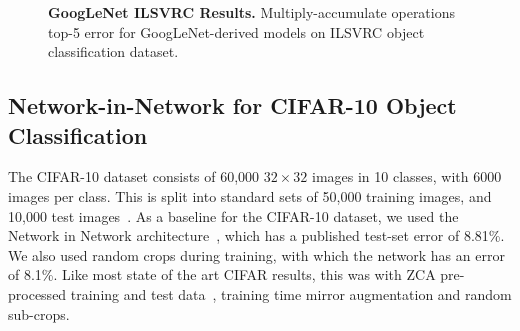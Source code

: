 \documentclass[thesis]{subfiles}
\begin{document}
    \begin{figure}[tbp] 
        \centering
        \datatable
        
        
        \caption[Low-Rank GoogLeNet ILSVRC results]{\textbf{GoogLeNet ILSVRC Results.} Multiply-accumulate operations \vs top-5 error for GoogLeNet-derived models on ILSVRC object classification dataset.}
        \label{fig:googlenetimagenetresultsch4}
    \end{figure}
    
    \subsection{Network-in-Network for CIFAR-10 Object Classification}
    The CIFAR-10 dataset consists of 60,000 $32\times 32$ images in 10 classes, with 6000 images per class. This is split into standard sets of 50,000 training images, and 10,000 test images~\citep{CIFAR10}. As a baseline for the CIFAR-10 dataset, we used the Network in Network architecture~\citep{Lin2014}, which has a published test-set error of 8.81\%. We also used random crops during training, with which the network has an error of 8.1\%. Like most state of the art CIFAR results, this was with ZCA pre-processed training and test data~\citep{goodfellow2013maxout}, training time mirror augmentation and random sub-crops. 
\end{document}

